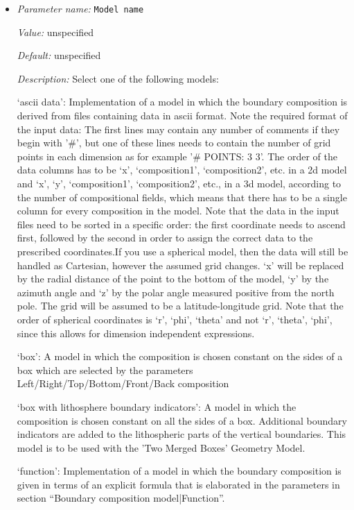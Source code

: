 \begin{itemize}
\item {\it Parameter name:} {\tt Model name}
\label{parameters:Boundary composition model/Model name}


{\it Value:} unspecified


{\it Default:} unspecified


{\it Description:} Select one of the following models:

`ascii data': Implementation of a model in which the boundary composition is derived from files containing data in ascii format. Note the required format of the input data: The first lines may contain any number of comments if they begin with '\#', but one of these lines needs to contain the number of grid points in each dimension as for example '\# POINTS: 3 3'. The order of the data columns has to be `x', `composition1', `composition2', etc. in a 2d model and `x', `y', `composition1', `composition2', etc., in a 3d model, according to the number of compositional fields, which means that there has to be a single column for every composition in the model. Note that the data in the input files need to be sorted in a specific order: the first coordinate needs to ascend first, followed by the second in order to assign the correct data to the prescribed coordinates.If you use a spherical model, then the data will still be handled as Cartesian, however the assumed grid changes. `x' will be replaced by the radial distance of the point to the bottom of the model, `y' by the azimuth angle and `z' by the polar angle measured positive from the north pole. The grid will be assumed to be a latitude-longitude grid. Note that the order of spherical coordinates is `r', `phi', `theta' and not `r', `theta', `phi', since this allows for dimension independent expressions.

`box': A model in which the composition is chosen constant on the sides of a box which are selected by the parameters Left/Right/Top/Bottom/Front/Back composition

`box with lithosphere boundary indicators': A model in which the composition is chosen constant on all the sides of a box. Additional boundary indicators are added to the lithospheric parts of the vertical boundaries. This model is to be used with the 'Two Merged Boxes' Geometry Model.

`function': Implementation of a model in which the boundary composition is given in terms of an explicit formula that is elaborated in the parameters in section ``Boundary composition model|Function''. 


\end{itemize}

